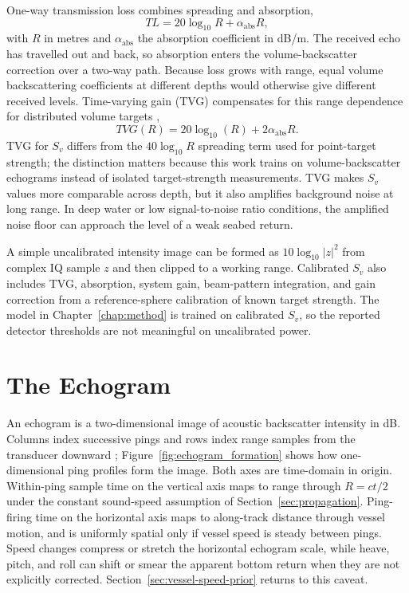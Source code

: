 One-way transmission loss combines spreading and absorption,
\begin{equation}
    TL = 20 \log_{10} R + \alpha_{\mathrm{abs}} R,
\end{equation}
with $R$ in metres and $\alpha_{\mathrm{abs}}$ the absorption coefficient in dB/m. The received echo has travelled out and back, so absorption enters the volume-backscatter correction over a two-way path. Because loss grows with range, equal volume backscattering coefficients at different depths would otherwise give different received levels. Time-varying gain (TVG) compensates for this range dependence for distributed volume targets \cite{demer_calibration_2015},
\begin{equation}
    TVG(R) = 20 \log_{10}(R) + 2\alpha_{\mathrm{abs}} R.
\end{equation}
TVG for $S_v$ differs from the $40\log_{10}R$ spreading term used for point-target strength; the distinction matters because this work trains on volume-backscatter echograms instead of isolated target-strength measurements. TVG makes $S_v$ values more comparable across depth, but it also amplifies background noise at long range. In deep water or low signal-to-noise ratio conditions, the amplified noise floor can approach the level of a weak seabed return.

A simple uncalibrated intensity image can be formed as $10\log_{10}|z|^2$ from complex IQ sample $z$ and then clipped to a working range. Calibrated $S_v$ also includes TVG, absorption, system gain, beam-pattern integration, and gain correction from a reference-sphere calibration of known target strength. The model in Chapter~\ref{chap:method} is trained on calibrated $S_v$, so the reported detector thresholds are not meaningful on uncalibrated power.

\section{The Echogram}

An echogram is a two-dimensional image of acoustic backscatter intensity in dB. Columns index successive pings and rows index range samples from the transducer downward \cite{demer_calibration_2015}; Figure~\ref{fig:echogram_formation} shows how one-dimensional ping profiles form the image. Both axes are time-domain in origin. Within-ping sample time on the vertical axis maps to range through $R=ct/2$ under the constant sound-speed assumption of Section~\ref{sec:propagation}. Ping-firing time on the horizontal axis maps to along-track distance through vessel motion, and is uniformly spatial only if vessel speed is steady between pings. Speed changes compress or stretch the horizontal echogram scale, while heave, pitch, and roll can shift or smear the apparent bottom return when they are not explicitly corrected. Section~\ref{sec:vessel-speed-prior} returns to this caveat.

